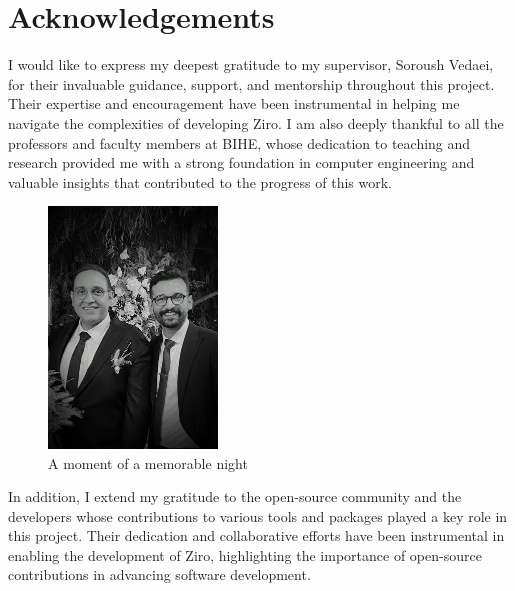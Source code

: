 \section{Acknowledgements}

I would like to express my deepest gratitude to my supervisor, Soroush Vedaei, for their invaluable guidance, support, and mentorship throughout this project. Their expertise and encouragement have been instrumental in helping me navigate the complexities of developing Ziro. I am also deeply thankful to all the professors and faculty members at BIHE, whose dedication to teaching and research provided me with a strong foundation in computer engineering and valuable insights that contributed to the progress of this work.

\vspace{2em}

\begin{figure}[H]
	\centering
	\includegraphics[width=0.4\textwidth]{Supervisor.jpg}
	\caption{A moment of a memorable night}
	\label{fig:supervisor}
\end{figure}

\vspace{2em}

In addition, I extend my gratitude to the open-source community and the developers whose contributions to various tools and packages played a key role in this project. Their dedication and collaborative efforts have been instrumental in enabling the development of Ziro, highlighting the importance of open-source contributions in advancing software development.














\pagebreak
